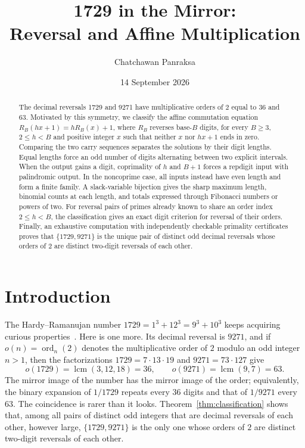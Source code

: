 \documentclass[11pt]{amsart}
\title[1729 in the Mirror]{1729 in the Mirror:\\Reversal and Affine Multiplication}
\author{Chatchawan Panraksa}
\date{14 September 2026}
\theoremstyle{remark}\newtheorem{remark}[theorem]{Remark}
\DeclareMathOperator{\ord}{ord}
\DeclareMathOperator{\lcm}{lcm}
\begin{document}
\raggedbottom
\setlength{\emergencystretch}{1em}
\begin{abstract}
The decimal reversals 1729 and 9271 have multiplicative orders of $2$ equal to 36 and 63. Motivated by this symmetry, we classify the affine commutation equation $R_B(hx+1)=hR_B(x)+1$, where $R_B$ reverses base-$B$ digits, for every $B\ge3$, $2\le h<B$ and positive integer $x$ such that neither $x$ nor $hx+1$ ends in zero. Comparing the two carry sequences separates the solutions by their digit lengths. Equal lengths force an odd number of digits alternating between two explicit intervals. When the output gains a digit, coprimality of $h$ and $B+1$ forces a repdigit input with palindromic output. In the noncoprime case, all inputs instead have even length and form a finite family. A slack-variable bijection gives the sharp maximum length, binomial counts at each length, and totals expressed through Fibonacci numbers or powers of two. For reversal pairs of primes already known to share an order index $2\le h<B$, the classification gives an exact digit criterion for reversal of their orders. Finally, an exhaustive computation with independently checkable primality certificates proves that $\{1729,9271\}$ is the unique pair of distinct odd decimal reversals whose orders of $2$ are distinct two-digit reversals of each other.
\end{abstract}
\maketitle

\section{Introduction}

The Hardy--Ramanujan number $1729=1^3+12^3=9^3+10^3$ keeps acquiring curious properties~\cite{Bhakat2017,Luca2026,Taneja2017}. Here is one more. Its decimal reversal is $9271$, and if $o(n)=\ord_n(2)$ denotes the multiplicative order of $2$ modulo an odd integer $n>1$, then the factorizations $1729=7\cdot13\cdot19$ and $9271=73\cdot127$ give
\begin{equation}\label{eq:1729}
 o(1729)=\lcm(3,12,18)=36,
 \qquad o(9271)=\lcm(9,7)=63.
\end{equation}
The mirror image of the number has the mirror image of the order; equivalently, the binary expansion of $1/1729$ repeats every $36$ digits and that of $1/9271$ every $63$. The coincidence is rarer than it looks. Theorem~\ref{thm:classification} shows that, among all pairs of distinct odd integers that are decimal reversals of each other, however large, $\{1729,9271\}$ is the only one whose orders of $2$ are distinct two-digit reversals of each other.
\end{document}
